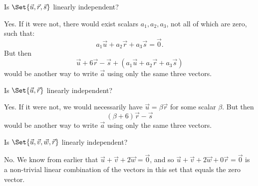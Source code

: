 	\begin{parts}[resume]
		\item Is $\Set{\vec u,\vec r,\vec s}$ linearly independent?
			\begin{solution}
				Yes. If it were not, there would exist scalars $a_1, a_2, a_3$,
				not all of which are zero, such that:
				\[
					a_1 \vec u + a_2 \vec r + a_3\vec s = \vec 0.
				\]
				But then
				\[
					\vec u+6\vec r-\vec s + (a_1 \vec u + a_2 \vec r + a_3\vec s)
				\]
				would be another way to write $\vec a$ using only the same three
				vectors.
			\end{solution}
		\item Is $\Set{\vec u,\vec r}$ linearly independent?
			\begin{solution}
				Yes. If it were not, we would necessarily have $\vec u = \beta \vec r$
				for some scalar $\beta$. But then
				\[
					(\beta + 6) \vec r - \vec s
				\]
				would be another way to write $\vec a$ using only the same three
				vectors.
			\end{solution}
		\item Is $\Set{\vec u,\vec v,\vec w,\vec r}$ linearly independent?
			\begin{solution}
				No. We know from earlier that $\vec u+\vec v+2\vec w=\vec 0$, and
				so $\vec u+\vec v+2\vec w+0\vec r=\vec 0$ is a non-trivial linear
				combination of the vectors in this set that equals the zero vector.
			\end{solution}
	\end{parts}


